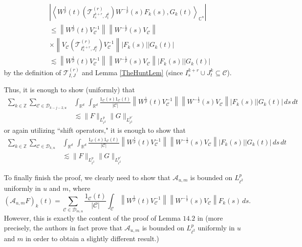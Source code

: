 \documentclass[12pt,reqno ]{amsart}
\numberwithin{equation}{section}
\theoremstyle{definition}
\newcommand{\C}{\ensuremath{\mathbb{C}^n}}
\newcommand{\Z}{\ensuremath{\mathbb{Z}}}
\newcommand{\Rd}{\ensuremath{\mathbb{R}^d}}
\newcommand{\D}{\ensuremath{\mathscr{D}}}
\newcommand{\ip}[2]{\ensuremath{\left\langle#1,#2\right\rangle}}
\newcommand{\MC}[1]{\ensuremath{\mathcal{#1}}}
\begin{document}
\begin{align*} & \left| \ip{W^{\frac{1}{p}} (t) (\MC{T}_{I_{s} ^{k+r}, J_t ^{k}} ^{(r)} )  W^{-\frac{1}{p}} (s) F_k (s)}{G_k(t)}_{\C} \right| \\ &  \leq  \left\|W^\frac{1}{p} (t) V_\MC{C} ^{-1}  \right\| \left\| W^{-\frac{1}{p}} (s)  V_\MC{C} \right\|  \\ & \times    \left\|  V_\MC{C} (\MC{T}_{I_{s} ^{k+r}, J_t ^{k}} ^{(r)} ) V_\MC{C} ^{-1}  \right\| |F_k(s)|     |G_k (t)| \\ & \lesssim  \left\|W^\frac{1}{p} (t) V_\MC{C} ^{-1}  \right\| \left\| W^{-\frac{1}{p}} (s)  V_\MC{C} \right\| |F_k(s)| |G_k (t)|  \end{align*} by the definition of $\MC{T}_{I, J} ^{(r)}$ and Lemma \ref{TheHuntLem} (since $I_{s} ^{k+r} \cup J_t ^{k} \subseteq \MC{C}$).

Thus, it is enough to show (uniformly) that \begin{align*}      \sum_{k \in \Z} \sum_{\MC{C} \in \D_{k - j - 2, u}} & \int_{\Rd} \, \int_{\Rd}   \frac{1_{\MC{C}}(s) 1_{\MC{C}}(t)}{|\MC{C}|} \left\|W^\frac{1}{p} (t) V_\MC{C} ^{-1}  \right\| \left\| W^{-\frac12} (s)  V_\MC{C} \right\| |F_k(s)| |G_k (t)|  \, ds \, dt  \\ & \lesssim  \|F\|_{L^p _{\ell^2}} \|G\|_{L^{p'} _{\ell^2}} \end{align*} or again utilizing ``shift operators," it is enough to show that \begin{align*}      \sum_{k \in \Z} \sum_{\MC{C} \in \D_{k, u}} & \int_{\Rd} \, \int_{\Rd}   \frac{1_{\MC{C}}(s) 1_{\MC{C}}(t)}{|\MC{C}|} \left\|W^\frac{1}{p} (t) V_\MC{C} ^{-1}  \right\| \left\| W^{-\frac12} (s)  V_\MC{C} \right\| |F_k(s)| |G_k (t)|  \, ds \, dt \\ & \lesssim  \|F\|_{L^p _{\ell^2}} \|G\|_{L^{p'} _{\ell^2}} \end{align*}

To finally finish the proof, we clearly need to show that $\MC{A}_{u, m}$ is bounded on $L^p_{\ell^2}$ uniformly in $u$ and $m$, where  \begin{equation*}(\MC{A}_{u, m} F)_k (t) = \sum_{\MC{C} \in \D_{m, u}  } \frac{1_\MC{C}(t)}{|\MC{C}|} \int_\MC{C} \left\|W^\frac{1}{p} (t) V_\MC{C} ^{-1}  \right\| \left\| W^{-\frac12} (s)  V_\MC{C} \right\| F_k(s) \, ds. \end{equation*}   However, this is exactly the content of the proof of Lemma $14.2$ in \cite{NT} (more precisely, the authors in fact prove that $\MC{A}_{u, m}$ is bounded on $L^p_{\ell^2}$ uniformly in $u$ and $m$ in order to obtain a slightly different result.)
\end{document}
